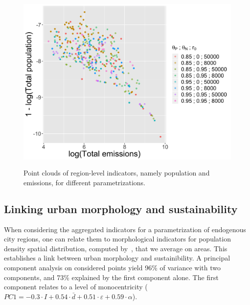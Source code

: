 \documentclass{jimis-en}
\begin{document}
\begin{figure}[ht] 
  {\includegraphics[width=\linewidth]{figures/full_effective_pareto.png}}
  \centering
  \label{fig:paretos}
  \caption{Point clouds of region-level indicators, namely population and emissions, for different parametrizations.}
\end{figure}










\subsection{Linking urban morphology and sustainability}



When considering the aggregated indicators for a parametrization of endogenous city regions, one can relate them to morphological indicators for population density spatial distribution, computed by~\cite{raimbault2018calibration}, that we average on areas. This establishes a link between urban morphology and sustainibility. A principal component analysis on considered points yield 96\% of variance with two components, and 73\% explained by the first component alone. The first component relates to a level of monocentricity ($PC1 = -0.3\cdot I + 0.54 \cdot \bar{d} + 0.51\cdot \varepsilon + 0.59 \cdot \alpha$).
\end{document}
